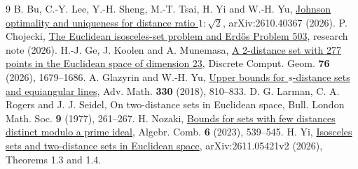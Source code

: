 \documentclass[11pt]{article}
\begin{document}
\begin{thebibliography}{9}\small
{} B. Bu, C.-Y. Lee, Y.-H. Sheng, M.-T. Tsai, H. Yi and W.-H. Yu, \href{https://arxiv.org/abs/2610.40367}{Johnson optimality and uniqueness for distance ratio $1:\sqrt2$}, arXiv:2610.40367 (2026).
 P. Chojecki, \href{https://www.ulam.ai/research/erdos503.pdf}{The Euclidean isosceles-set problem and Erd\H{o}s Problem 503}, research note (2026).
 H.-J. Ge, J. Koolen and A. Munemasa, \href{https://doi.org/10.1007/s00454-026-00843-9}{A 2-distance set with 277 points in the Euclidean space of dimension 23}, Discrete Comput. Geom. \textbf{76} (2026), 1679--1686.
 A. Glazyrin and W.-H. Yu, \href{https://arxiv.org/abs/1611.09479}{Upper bounds for $s$-distance sets and equiangular lines}, Adv. Math. \textbf{330} (2018), 810--833.
 D. G. Larman, C. A. Rogers and J. J. Seidel, On two-distance sets in Euclidean space, Bull. London Math. Soc. \textbf{9} (1977), 261--267.
 H. Nozaki, \href{https://doi.org/10.5802/alco.272}{Bounds for sets with few distances distinct modulo a prime ideal}, Algebr. Comb. \textbf{6} (2023), 539--545.
 H. Yi, \href{https://arxiv.org/html/2611.05421v2}{Isosceles sets and two-distance sets in Euclidean space}, arXiv:2611.05421v2 (2026), Theorems 1.3 and 1.4.
\end{thebibliography}
\end{document}
